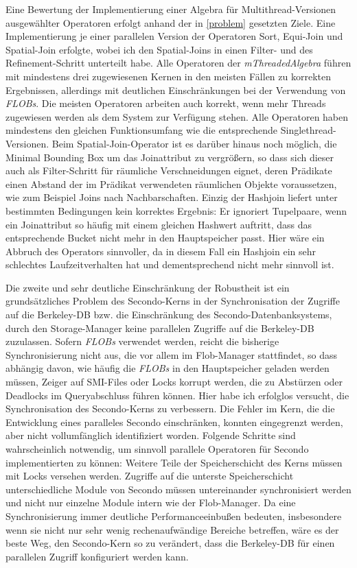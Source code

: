 \documentclass[a4paper,12pt,twoside]{article}
\newcommand{\Fb}[1]{\textit{#1}} %
\begin{document}
{Eine Bewertung der Implementierung einer Algebra für Multithread-Versionen ausgewählter Operatoren erfolgt anhand der in \autoref{problem} gesetzten Ziele. Eine Implementierung je einer parallelen Version der Operatoren Sort, Equi-Join und Spatial-Join erfolgte, wobei ich den Spatial-Joins in einen Filter- und des Refinement-Schritt unterteilt habe. Alle Operatoren der \Fb{mThreadedAlgebra} führen mit mindestens drei zugewiesenen Kernen in den meisten Fällen zu korrekten Ergebnissen, allerdings mit deutlichen Einschränkungen bei der Verwendung von \Fb{FLOBs}. Die meisten Operatoren arbeiten auch korrekt, wenn mehr Threads zugewiesen werden als dem System zur Verfügung stehen. Alle Operatoren haben mindestens den gleichen Funktionsumfang wie die entsprechende Singlethread-Versionen. Beim Spatial-Join-Operator ist es darüber hinaus noch möglich, die Minimal Bounding Box um das Joinattribut zu vergrößern, so dass sich dieser auch als Filter-Schritt für räumliche Verschneidungen eignet, deren Prädikate einen Abstand der im Prädikat verwendeten räumlichen Objekte voraussetzen, wie zum Beispiel Joins nach Nachbarschaften. Einzig der Hashjoin liefert unter bestimmten Bedingungen kein korrektes Ergebnis: Er ignoriert Tupelpaare, wenn ein Joinattribut so häufig mit einem gleichen Hashwert auftritt, dass das entsprechende Bucket nicht mehr in den Hauptspeicher passt. Hier wäre ein Abbruch des Operators sinnvoller, da in diesem Fall ein Hashjoin ein sehr schlechtes Laufzeitverhalten hat und dementsprechend nicht mehr sinnvoll ist.

Die zweite und sehr deutliche Einschränkung der Robustheit ist ein grundsätzliches Problem des Secondo-Kerns in der Synchronisation der Zugriffe auf die Berkeley-DB bzw. die Einschränkung des Secondo-Datenbanksystems, durch den Storage-Manager keine parallelen Zugriffe auf die Berkeley-DB zuzulassen. Sofern \Fb{FLOBs} verwendet werden, reicht die bisherige Synchronisierung nicht aus, die vor allem im Flob-Manager stattfindet, so dass abhängig davon, wie häufig die \Fb{FLOBs} in den Hauptspeicher geladen werden müssen, Zeiger auf SMI-Files oder Locks korrupt werden, die zu Abstürzen oder Deadlocks im Queryabschluss führen können. Hier habe ich erfolglos versucht, die Synchronisation des Secondo-Kerns zu verbessern. Die Fehler im Kern, die die Entwicklung eines paralleles Secondo einschränken, konnten eingegrenzt werden, aber nicht vollumfänglich identifiziert worden. Folgende Schritte sind wahrscheinlich notwendig, um sinnvoll parallele Operatoren für Secondo implementierten zu können: Weitere Teile der Speicherschicht des Kerns müssen mit Locks versehen werden. Zugriffe auf die unterste Speicherschicht unterschiedliche Module von Secondo müssen untereinander synchronisiert werden und nicht nur einzelne Module intern wie der Flob-Manager. Da eine Synchronisierung immer deutliche Performanceeinbußen bedeuten, insbesondere wenn sie nicht nur sehr wenig rechenaufwändige Bereiche betreffen, wäre es der beste Weg, den Secondo-Kern so zu verändert, dass die Berkeley-DB für einen parallelen Zugriff konfiguriert werden kann. 

}
\end{document}
